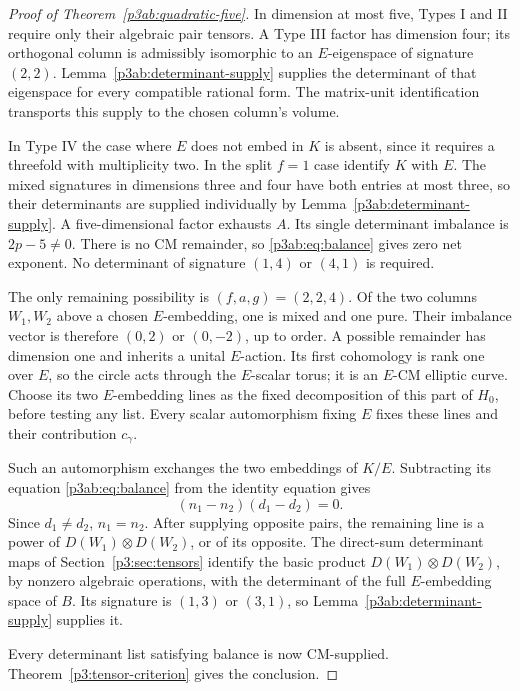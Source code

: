 \documentclass[11pt]{article}
\numberwithin{equation}{section}
\begin{document}
\begin{proof}[Proof of Theorem~\ref{p3ab:quadratic-five}]
In dimension at most five, Types I and II require only their
algebraic pair tensors.  A Type III factor has dimension four;
its orthogonal column is admissibly isomorphic to an
\(E\)-eigenspace of signature \((2,2)\).
Lemma~\ref{p3ab:determinant-supply} supplies the determinant of
that eigenspace for every compatible rational form.  The
matrix-unit identification transports this supply to the chosen
column's volume.

In Type IV the case where \(E\) does not embed in \(K\) is
absent, since it requires a threefold with multiplicity two.
In the split \(f=1\) case identify \(K\) with \(E\).  The mixed signatures in dimensions three and four
have both entries at most three, so their determinants are
supplied individually by Lemma~\ref{p3ab:determinant-supply}.
A five-dimensional factor exhausts \(A\).  Its single determinant
imbalance is \(2p-5\ne0\).  There is no CM remainder, so
\eqref{p3ab:eq:balance} gives zero net exponent.  No determinant
of signature \((1,4)\) or \((4,1)\) is required.

The only remaining possibility is \((f,a,g)=(2,2,4)\).  Of
the two columns \(W_1,W_2\) above a chosen \(E\)-embedding,
one is mixed and one pure.  Their imbalance vector is therefore
\((0,2)\) or \((0,-2)\), up to order.  A possible remainder
has dimension one and inherits a unital \(E\)-action.  Its
first cohomology is rank one over \(E\), so the circle acts
through the \(E\)-scalar torus; it is an \(E\)-CM elliptic
curve.  Choose its two \(E\)-embedding lines as the fixed
decomposition of this part of \(H_0\), before testing any list.
Every scalar automorphism fixing \(E\) fixes these lines and
their contribution \(c_\gamma\).

Such an automorphism exchanges the two embeddings of \(K/E\).
Subtracting its equation \eqref{p3ab:eq:balance} from the
identity equation gives
\[
 (n_1-n_2)(d_1-d_2)=0.
\]
Since \(d_1\ne d_2\), \(n_1=n_2\).  After supplying opposite
pairs, the remaining line is a power of
\(D(W_1)\otimes D(W_2)\), or of its opposite.  The direct-sum
determinant maps of Section~\ref{p3:sec:tensors} identify the
basic product \(D(W_1)\otimes D(W_2)\), by nonzero algebraic
operations, with the determinant of
the full \(E\)-embedding space of \(B\).  Its signature is
\((1,3)\) or \((3,1)\), so
Lemma~\ref{p3ab:determinant-supply} supplies it.

Every determinant list satisfying balance is now CM-supplied.
Theorem~\ref{p3:tensor-criterion} gives the conclusion.
\end{proof}
\end{document}
